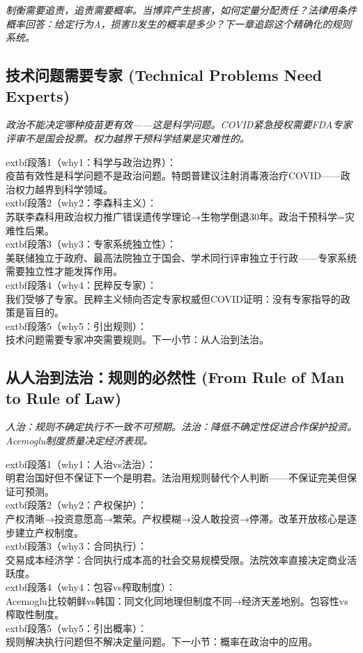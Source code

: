 \documentclass[a4paper,12pt]{book}
\newenvironment{motivation}{\begin{tcolorbox}[colback=gray!10,colframe=gray!60,title=\textit{动机}]\small\itshape}{\end{tcolorbox}}
\begin{document}
\begin{motivation}
\begin{motivation}
\begin{motivation}
制衡需要追责，追责需要概率。当博弈产生损害，如何定量分配责任？法律用条件概率回答：给定行为A，损害B发生的概率是多少？下一章追踪这个精确化的规则系统。

	
	\subsection{技术问题需要专家 (Technical Problems Need Experts)}
	\begin{motivation}政治不能决定哪种疫苗更有效——这是科学问题。COVID紧急授权需要FDA专家评审不是国会投票。权力越界干预科学结果是灾难性的。\end{motivation}
		extbf{段落1（why1：科学与政治边界）}：\\疫苗有效性是科学问题不是政治问题。特朗普建议注射消毒液治疗COVID——政治权力越界到科学领域。\\	extbf{段落2（why2：李森科主义）}：\\苏联李森科用政治权力推广错误遗传学理论→生物学倒退30年。政治干预科学=灾难性后果。\\	extbf{段落3（why3：专家系统独立性）}：\\美联储独立于政府、最高法院独立于国会、学术同行评审独立于行政——专家系统需要独立性才能发挥作用。\\	extbf{段落4（why4：民粹反专家）}：\\我们受够了专家。民粹主义倾向否定专家权威但COVID证明：没有专家指导的政策是盲目的。\\	extbf{段落5（why5：引出规则）}：\\技术问题需要专家冲突需要规则。下一小节：从人治到法治。

	\subsection{从人治到法治：规则的必然性 (From Rule of Man to Rule of Law)}
	\begin{motivation}人治：规则不确定执行不一致不可预期。法治：降低不确定性促进合作保护投资。Acemoglu制度质量决定经济表现。\end{motivation}
		extbf{段落1（why1：人治vs法治）}：\\明君治国好但不保证下一个是明君。法治用规则替代个人判断——不保证完美但保证可预测。\\	extbf{段落2（why2：产权保护）}：\\产权清晰→投资意愿高→繁荣。产权模糊→没人敢投资→停滞。改革开放核心是逐步建立产权制度。\\	extbf{段落3（why3：合同执行）}：\\交易成本经济学：合同执行成本高的社会交易规模受限。法院效率直接决定商业活跃度。\\	extbf{段落4（why4：包容vs榨取制度）}：\\Acemoglu比较朝鲜vs韩国：同文化同地理但制度不同→经济天差地别。包容性vs榨取性制度。\\	extbf{段落5（why5：引出概率）}：\\规则解决执行问题但不解决定量问题。下一小节：概率在政治中的应用。


\end{motivation}
\end{motivation}
\end{motivation}
\end{document}
